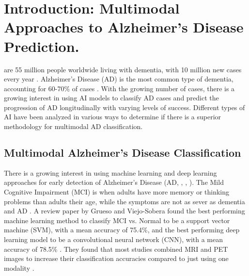 \section{Introduction: Multimodal Approaches to Alzheimer’s Disease Prediction.}
\label{sec:introduction}
 are 55 million people worldwide living with dementia, with 10 million new cases every year \cite{who_dementia_nodate}. Alzheimer's Disease (AD) is the most common type of dementia, accounting for 60-70\% of cases \cite{who_dementia_nodate}. With the growing number of cases, there is a growing interest in using AI models to classify AD cases and predict the progression of AD longitudinally with varying levels of success. Different types of AI have been analyzed in various ways to determine if there is a superior methodology for multimodal AD classification.


\subsection{Multimodal Alzheimer's Disease Classification}
There is a growing interest in using machine learning and deep learning approaches for early detection of Alzheimer's Disease (AD, \cite{lin_convolutional_2018}, \cite{grueso_machine_2021}, \cite{borchert_artificial_2021}). The Mild Cognitive Impairment (MCI) is when adults have more memory or thinking problems than adults their age, while the symptoms are not as sever as dementia and AD \cite{NationalInstituteOfAging_MildCognitiveImpairment_2024}.   A review paper by Grueso and Viejo-Sobera found the best performing machine learning method to classify MCI vs. Normal to be a support vector machine (SVM), with a mean accuracy of 75.4\%, and the best performing deep learning model to be a convolutional neural network (CNN), with a mean accuracy of 78.5\% \cite{grueso_machine_2021}. They found that most studies combined MRI and PET images to increase their classification accuracies compared to just using one modality \cite{grueso_machine_2021}\cite{borchert_artificial_2021}. 

